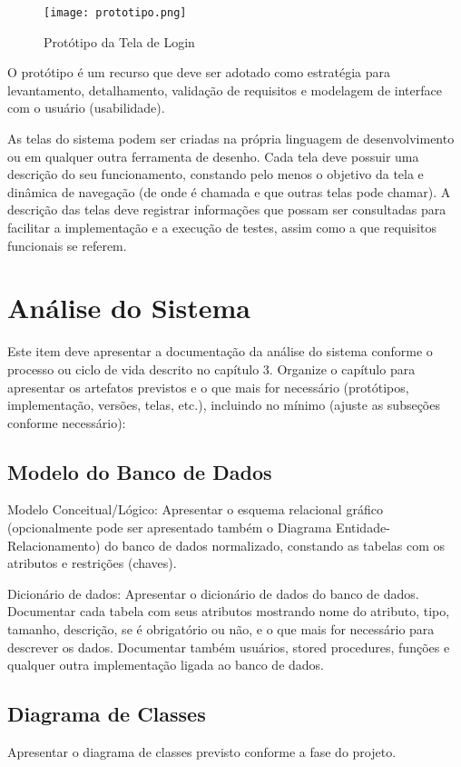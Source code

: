 \documentclass[a4paper,12pt]{article}
\begin{document}
\begin{figure}[h]
    \centering
    \texttt{[image: prototipo.png]}
    \caption{Protótipo da Tela de Login}
    \label{fig:prototipo_login}
\end{figure}

O protótipo é um recurso que deve ser adotado como estratégia para levantamento, detalhamento, validação de requisitos e modelagem de interface com o usuário (usabilidade).

As telas do sistema podem ser criadas na própria linguagem de desenvolvimento ou em qualquer outra ferramenta de desenho. Cada tela deve possuir uma descrição do seu funcionamento, constando pelo menos o objetivo da tela e dinâmica de navegação (de onde é chamada e que outras telas pode chamar). A descrição das telas deve registrar informações que possam ser consultadas para facilitar a implementação e a execução de testes, assim como a que requisitos funcionais se referem.

\newpage
\section{Análise do Sistema}
Este item deve apresentar a documentação da análise do sistema conforme o processo ou ciclo de vida descrito no capítulo 3. Organize o capítulo para apresentar os artefatos previstos e o que mais for necessário (protótipos, implementação, versões, telas, etc.), incluindo no mínimo (ajuste as subseções conforme necessário):

\subsection{Modelo do Banco de Dados}
Modelo Conceitual/Lógico: Apresentar o esquema relacional gráfico (opcionalmente pode ser apresentado também o Diagrama Entidade-Relacionamento) do banco de dados normalizado, constando as tabelas com os atributos e restrições (chaves).

Dicionário de dados: Apresentar o dicionário de dados do banco de dados. Documentar cada tabela com seus atributos mostrando nome do atributo, tipo, tamanho, descrição, se é obrigatório ou não, e o que mais for necessário para descrever os dados. Documentar também usuários, stored procedures, funções e qualquer outra implementação ligada ao banco de dados.

\subsection{Diagrama de Classes}
Apresentar o diagrama de classes previsto conforme a fase do projeto.
\end{document}

